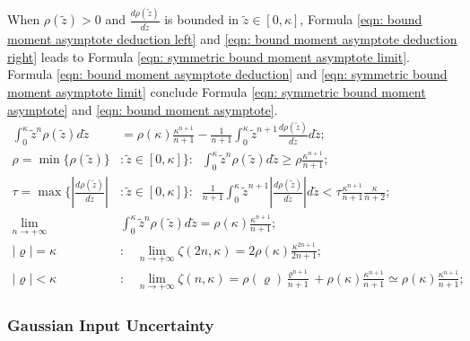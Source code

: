 \documentclass[twoside]{article}
\numberwithin{equation}{section}
\newcommand{\eqspace}{\;\;\;}
\begin{document}
When $\rho(\tilde{z}) > 0$ and $\frac{d \rho(\tilde{z})}{d \tilde{z}}$ is bounded in $\tilde{z} \in [0, \kappa]$, Formula \eqref{eqn: bound moment asymptote deduction left} and \eqref{eqn: bound moment asymptote deduction right} leads to Formula \eqref{eqn: symmetric bound moment asymptote limit}.
 Formula \eqref{eqn: bound moment asymptote deduction} and \eqref{eqn: symmetric bound moment asymptote limit} conclude Formula \eqref{eqn: symmetric bound moment asymptote} and \eqref{eqn: bound moment asymptote}.
\begin{align}
\label{eqn: bound moment asymptote deduction}
\int_{0}^{\kappa} \tilde{z}^n \rho(\tilde{z}) d \tilde{z} &= \rho(\kappa) \frac{\kappa^{n+1}}{n+1} 
			- \frac{1}{n+1} \int_{0}^{\kappa} \tilde{z}^{n+1} \frac{d \rho(\tilde{z})}{d \tilde{z}} d \tilde{z}; \\
\label{eqn: bound moment asymptote deduction left}
\rho = \min\{ \rho(\tilde{z}) \}&: \tilde{z} \in [0, \kappa] \}:\;\; 
		\int_{0}^{\kappa} \tilde{z}^n \rho(\tilde{z}) d \tilde{z} \geq \rho \frac{\kappa^{n+1}}{n+1}; \\
\label{eqn: bound moment asymptote deduction right}
\tau = \max\{ |\frac{d \rho(\tilde{z})}{d \tilde{z}}|&: \tilde{z} \in [0, \kappa] \}:\;\; 
\frac{1}{n+1} \int_{0}^{\kappa} \tilde{z}^{n+1} |\frac{d \rho(\tilde{z})}{d \tilde{z}}| d \tilde{z} <
		\tau \frac{\kappa^{n+1}}{n+1}\frac{\kappa}{n+2}; \\
\label{eqn: symmetric bound moment asymptote limit}
\lim_{n \rightarrow +\infty}& \int_{0}^{\kappa} \tilde{z}^n \rho(\tilde{z}) d \tilde{z} = \rho(\kappa) \frac{\kappa^{n+1}}{n+1}; \\
\label{eqn: symmetric bound moment asymptote}
|\varrho| = \kappa &:\eqspace \lim_{n \rightarrow +\infty} \zeta(2n, \kappa) = 2 \rho(\kappa) \frac{\kappa^{2n+1}}{2n+1}; \\
\label{eqn: bound moment asymptote}
|\varrho| < \kappa&:\eqspace \lim_{n \rightarrow +\infty} \zeta(n, \kappa) = \rho(\varrho) \frac{\varrho^{n+1}}{n+1} + \rho(\kappa) \frac{\kappa^{n+1}}{n+1} 
		\simeq \rho(\kappa) \frac{\kappa^{n+1}}{n+1};
\end{align}



\subsubsection{Gaussian Input Uncertainty}

\iffalse
\end{document}
